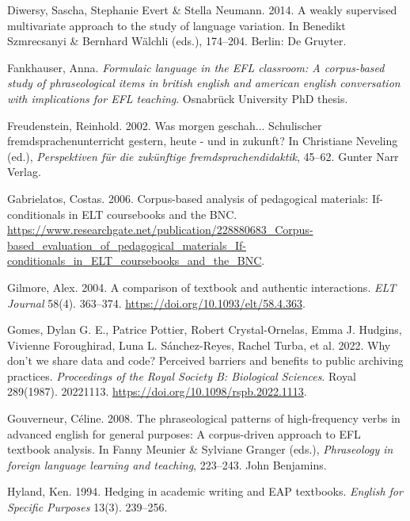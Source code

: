 \documentclass[
  letterpaper,
  DIV=11,
  numbers=noendperiod]{scrreprt}
\newlength{\cslhangindent}
\newenvironment{CSLReferences}[2] %
 {\begin{list}{}{%
  \setlength{\itemindent}{0pt}
  \setlength{\leftmargin}{0pt}
  \setlength{\parsep}{0pt}
  \ifodd #1
   \setlength{\leftmargin}{\cslhangindent}
   \setlength{\itemindent}{-1\cslhangindent}
  \fi
  \setlength{\itemsep}{#2\baselineskip}}}
 {\end{list}}
\begin{document}
\begin{CSLReferences}{1}{0}
Diwersy, Sascha, Stephanie Evert \& Stella Neumann. 2014. A weakly
supervised multivariate approach to the study of language variation. In
Benedikt Szmrecsanyi \& Bernhard Wälchli (eds.), 174--204. Berlin: De
Gruyter.

Fankhauser, Anna. \emph{Formulaic language in the EFL classroom: A
corpus-based study of phraseological items in british english and
american english conversation with implications for EFL teaching}.
Osnabrück University PhD thesis.

Freudenstein, Reinhold. 2002. Was morgen geschah... Schulischer
fremdsprachenunterricht gestern, heute - und in zukunft? In Christiane
Neveling (ed.), \emph{Perspektiven für die zukünftige
fremdsprachendidaktik}, 45--62. Gunter Narr Verlag.

Gabrielatos, Costas. 2006. Corpus-based analysis of pedagogical
materials: If-conditionals in ELT coursebooks and the BNC.
\url{https://www.researchgate.net/publication/228880683_Corpus-based_evaluation_of_pedagogical_materials_If-conditionals_in_ELT_coursebooks_and_the_BNC}.

Gilmore, Alex. 2004. A comparison of textbook and authentic
interactions. \emph{ELT Journal} 58(4). 363--374.
\url{https://doi.org/10.1093/elt/58.4.363}.

Gomes, Dylan G. E., Patrice Pottier, Robert Crystal-Ornelas, Emma J.
Hudgins, Vivienne Foroughirad, Luna L. Sánchez-Reyes, Rachel Turba, et
al. 2022. Why don't we share data and code? Perceived barriers and
benefits to public archiving practices. \emph{Proceedings of the Royal
Society B: Biological Sciences}. Royal 289(1987). 20221113.
\url{https://doi.org/10.1098/rspb.2022.1113}.

Gouverneur, Céline. 2008. The phraseological patterns of high-frequency
verbs in advanced english for general purposes: A corpus-driven approach
to EFL textbook analysis. In Fanny Meunier \& Sylviane Granger (eds.),
\emph{Phraseology in foreign language learning and teaching}, 223--243.
John Benjamins.

Hyland, Ken. 1994. Hedging in academic writing and EAP textbooks.
\emph{English for Specific Purposes} 13(3). 239--256.


\end{CSLReferences}
\end{document}
